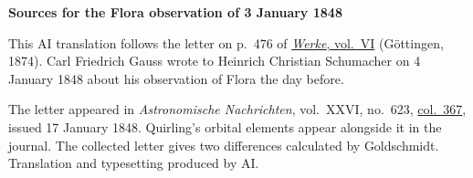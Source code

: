 \clearpage\thispagestyle{empty}
\begin{center}\textbf{Sources for the Flora observation of 3 January 1848}\end{center}
\noindent This AI translation follows the letter on p.~476 of \href{https://gdz.sub.uni-goettingen.de/id/PPN236007467}{\textit{Werke}, vol.~VI} (Göttingen, 1874). Carl Friedrich Gauss wrote to Heinrich Christian Schumacher on 4 January 1848 about his observation of Flora the day before.
\par\smallskip\noindent The letter appeared in \textit{Astronomische Nachrichten}, vol.~XXVI, no.~623, \href{https://api.digitale-sammlungen.de/iiif/image/v2/bsb10049451_00194/full/1800,/0/default.jpg}{col.~367}, issued 17 January 1848. Quirling’s orbital elements appear alongside it in the journal. The collected letter gives two differences calculated by Goldschmidt. Translation and typesetting produced by AI.
\clearpage
